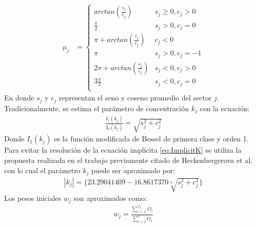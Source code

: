 \begin{align}
    \mu_j &= 
        \left\{
            \begin{array}{ll}
                arctan(\frac{s_j}{c_j})  & s_j \geq 0, c_j > 0\\
                \frac{\pi}{2} & s_j > 0, c_j = 0\\
                \pi + arctan(\frac{s_j}{c_j}) & c_j < 0\\
                \pi & s_j > 0, c_j = -1\\
                2\pi + arctan(\frac{s_j}{c_j}) & s_j < 0, c_j > 0\\
                3\frac{\pi}{2} & s_j < 0, c_j = 0\\
            \end{array}
        \right.
\end{align}
En donde $s_j$ y $c_j$ representan el seno y coseno promedio del sector $j$.\\
Tradicionalmente, se estima el parámetro de concentración $k_j$ con la ecuación:
\begin{align}\label{eq:ImplicitK}
    \frac{I_1(k_j)}{I_0(k_j)} = \sqrt{s_j^2 + c_j^2}
\end{align}
Donde $I_1(k_j)$ es la función modificada de Bessel de primera clase y orden 1.
Para evitar la resolución de la ecuación implícita \ref{eq:ImplicitK} se utiliza la propuesta realizada en el trabajo previamente citado de Heckenbergerova et al. con lo cual el parámetro $k_j$ puede ser aproximado por:\\
\begin{align}
    |k_j| = \{23.29041409 - 16.8617370\sqrt[4]{s_j^2 + c_j^2}\} 
\end{align}
Los pesos iniciales $w_j$ son aproximados como: \\
\begin{align}
    w_j = \frac{\sum_{i=J_l}^{J_u} O_i}{\sum_{i=1}^{T} O_i}
\end{align}

